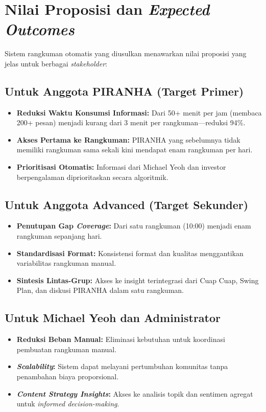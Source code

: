\section{Nilai Proposisi dan \textit{Expected Outcomes}}
\label{sec:value-proposition}

Sistem rangkuman otomatis yang diusulkan menawarkan nilai proposisi yang jelas untuk berbagai \textit{stakeholder}:

\subsection{Untuk Anggota PIRANHA (Target Primer)}

\begin{itemize}
\item \textbf{Reduksi Waktu Konsumsi Informasi:} Dari 50+ menit per jam (membaca 200+ pesan) menjadi kurang dari 3 menit per rangkuman—reduksi 94\%.
\item \textbf{Akses Pertama ke Rangkuman:} PIRANHA yang sebelumnya tidak memiliki rangkuman sama sekali kini mendapat enam rangkuman per hari.
\item \textbf{Prioritisasi Otomatis:} Informasi dari Michael Yeoh dan investor berpengalaman diprioritaskan secara algoritmik.
\end{itemize}

\subsection{Untuk Anggota Advanced (Target Sekunder)}

\begin{itemize}
\item \textbf{Penutupan Gap \textit{Coverage}:} Dari satu rangkuman (10:00) menjadi enam rangkuman sepanjang hari.
\item \textbf{Standardisasi Format:} Konsistensi format dan kualitas menggantikan variabilitas rangkuman manual.
\item \textbf{Sintesis Lintas-Grup:} Akses ke insight terintegrasi dari Cuap Cuap, Swing Plan, dan diskusi PIRANHA dalam satu rangkuman.
\end{itemize}

\subsection{Untuk Michael Yeoh dan Administrator}

\begin{itemize}
\item \textbf{Reduksi Beban Manual:} Eliminasi kebutuhan untuk koordinasi pembuatan rangkuman manual.
\item \textbf{\textit{Scalability}:} Sistem dapat melayani pertumbuhan komunitas tanpa penambahan biaya proporsional.
\item \textbf{\textit{Content Strategy Insights}:} Akses ke analisis topik dan sentimen agregat untuk \textit{informed decision-making}.
\end{itemize}

